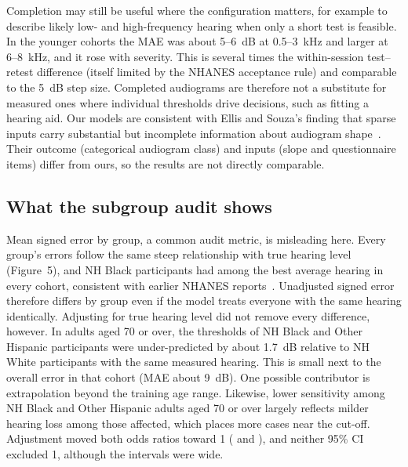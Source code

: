 \documentclass[11pt]{article}
\begin{document}
Completion may still be useful where the configuration matters, for example to describe likely low- and high-frequency hearing when only a short test is feasible. In the younger cohorts the MAE was about 5--6~dB at 0.5--3~kHz and larger at 6--8~kHz, and it rose with severity. This is several times the within-session test--retest difference (itself limited by the NHANES acceptance rule) and comparable to the 5~dB step size. Completed audiograms are therefore not a substitute for measured ones where individual thresholds drive decisions, such as fitting a hearing aid. Our models are consistent with Ellis and Souza's finding that sparse inputs carry substantial but incomplete information about audiogram shape~\cite{ellis2021}. Their outcome (categorical audiogram class) and inputs (slope and questionnaire items) differ from ours, so the results are not directly comparable.

\subsection*{What the subgroup audit shows}
Mean signed error by group, a common audit metric, is misleading here. Every group's errors follow the same steep relationship with true hearing level (Figure~5), and NH Black participants had among the best average hearing in every cohort, consistent with earlier NHANES reports~\cite{agrawal2008,lin2011older}. Unadjusted signed error therefore differs by group even if the model treats everyone with the same hearing identically. Adjusting for true hearing level did not remove every difference, however. In adults aged 70 or over, the thresholds of NH Black and Other Hispanic participants were under-predicted by about 1.7~dB relative to NH White participants with the same measured hearing. This is small next to the overall error in that cohort (MAE about 9~dB). One possible contributor is extrapolation beyond the training age range. Likewise, lower sensitivity among NH Black and Other Hispanic adults aged 70 or over largely reflects milder hearing loss among those affected, which places more cases near the cut-off. Adjustment moved both odds ratios toward 1 (\OrCondBlackExtB{} and \OrCondOthHispExtB{}), and neither 95\% CI excluded 1, although the intervals were wide.
\end{document}
